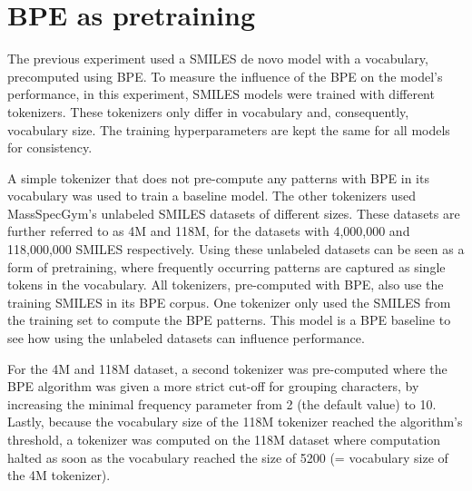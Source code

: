 \section{\ac{BPE} as pretraining}

The previous experiment used a SMILES de novo model with a vocabulary, precomputed using \ac{BPE}.
To measure the influence of the \acf{BPE} on the model's performance, in this experiment, SMILES models were trained with different tokenizers.
These tokenizers only differ in vocabulary and, consequently, vocabulary size.
The training hyperparameters are kept the same for all models for consistency.

A simple tokenizer that does not pre-compute any patterns with \ac{BPE} in its vocabulary was used to train a baseline model.
The other tokenizers used MassSpecGym's unlabeled SMILES datasets of different sizes.
These datasets are further referred to as 4M and 118M, for the datasets with 4,000,000 and 118,000,000 SMILES respectively.
Using these unlabeled datasets can be seen as a form of pretraining, where frequently occurring patterns are captured as single tokens in the vocabulary.
All tokenizers, pre-computed with \ac{BPE}, also use the training SMILES in its \ac{BPE} corpus.
One tokenizer only used the SMILES from the training set to compute the \ac{BPE} patterns.
This model is a \ac{BPE} baseline to see how using the unlabeled datasets can influence performance.

For the 4M and 118M dataset, a second tokenizer was pre-computed where the \ac{BPE} algorithm was given a more strict cut-off for grouping characters, by increasing the minimal frequency parameter from 2 (the default value) to 10.
Lastly, because the vocabulary size of the 118M tokenizer reached the algorithm's threshold, a tokenizer was computed on the 118M dataset where computation halted as soon as the vocabulary reached the size of 5200 (= vocabulary size of the 4M tokenizer). 


